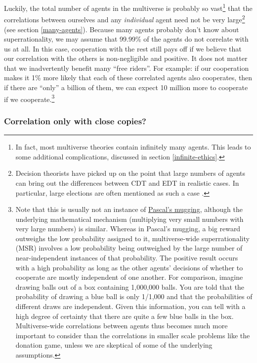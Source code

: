 Luckily, the total number of agents in the multiverse is probably so
vast\footnote{In fact, most multiverse theories contain infinitely many
  agents. This leads to some additional complications, discussed in
  section \ref{infinite-ethics}.} that the correlations between ourselves and any
\emph{individual} agent need not be very large\footnote{Decision
  theorists have picked up on the point that large numbers of agents can
  bring out the differences between CDT and EDT in realistic cases. In
  particular, large elections are often mentioned as such a case
  \parencite{Ahmed2014-ec}.} (see section
\ref{many-agents}). Because many
agents probably don't know about superrationality, we may assume that
99.99\% of the agents do not correlate with us at all. In this case,
cooperation with the rest still pays off if we believe that our
correlation with the others is non-negligible and positive. It does not
matter that we inadvertently benefit many ``free riders''. For example:
if our cooperation makes it 1\% more likely that each of these
correlated agents also cooperates, then if there are ``only'' a billion
of them, we can expect 10 million more to cooperate if we
cooperate.\footnote{Note that this is usually not an instance of
  \href{https://wiki.lesswrong.com/wiki/Pascal\%27s_mugging}{Pascal's
  mugging}, although the underlying mathematical mechanism (multiplying
  very small numbers with very large numbers) is similar. Whereas in
  Pascal's mugging, a big reward outweighs the low probability assigned
  to it, multiverse-wide superrationality (MSR) involves a low
  probability being outweighed by the large number of near-independent
  instances of that probability. The positive result occurs with a high
  probability as long as the other agents' decisions of whether to
  cooperate are mostly independent of one another. For comparison,
  imagine drawing balls out of a box containing 1,000,000 balls. You are
  told that the probability of drawing a blue ball is only 1/1,000 and
  that the probabilities of different draws are independent. Given this
  information, you can tell with a high degree of certainty that there
  are quite a few blue balls in the box. Multiverse-wide correlations
  between agents thus becomes much more important to consider than the
  correlations in smaller scale problems like the donation game, unless
  we are skeptical of some of the underlying assumptions.}

\subsubsection{Correlation only with close
copies?}\label{correlation-only-with-close-copies}

